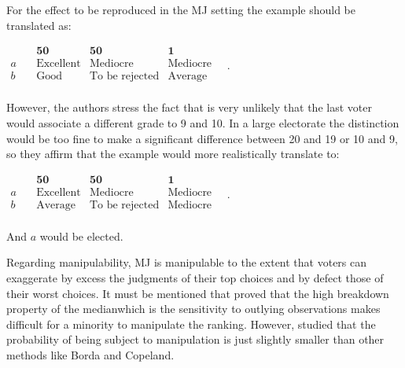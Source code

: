 	\begin{example}
		For the effect to be reproduced in the \ac{MJ} setting the example should be translated as:
	\begin{center}
		$
		\begin{array}{cccc}
			&\mathbf{50} & \mathbf{50} & \mathbf{1} \\
			a \quad &\text{Excellent}&\text{Mediocre}&\text{Mediocre}\\
			b \quad &\text{Good}&\text{To be rejected}&\text{Average}\\
		\end{array}\quad .
		$
	\end{center}
	However, the authors stress the fact that is very unlikely that the last voter would associate a different grade to 9 and 10. In a large electorate the distinction would be too fine to make a significant difference between 20 and 19 or 10 and 9, so they affirm that the example would more realistically translate to: 
	\begin{center}
		$
		\begin{array}{cccc}
			&\mathbf{50} & \mathbf{50} & \mathbf{1} \\
			a \quad &\text{Excellent}&\text{Mediocre}&\text{Mediocre}\\
			b \quad &\text{Average}&\text{To be rejected}&\text{Mediocre}\\
		\end{array}\quad .
		$
	\end{center}
	And $a$ would be elected. 
	\end{example}

	Regarding manipulability, \ac{MJ} is manipulable to the extent that voters can exaggerate by excess the judgments of their top choices and by defect those of their worst choices. It must be mentioned that \citet{Bassett1999} proved that the high breakdown property of the median\textemdash which is the sensitivity to outlying observations \textemdash makes difficult for a minority to manipulate the ranking. However, \citet{Gehrlein2003} studied that the probability of being subject to manipulation is just slightly smaller than other methods like Borda and Copeland.










